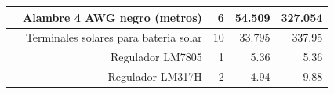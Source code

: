 \begin{landscape}
\begin{longtable}{|r|r|r|l|r|}
\hline
\cmidrule{Energético}    \rowcolor[rgb]{ .851,  .851,  .851}       & \multicolumn{1}{p{16.43em}|}{\cellcolor[rgb]{ 1,  1,  1}Alambre 4 AWG negro (metros)} & \cellcolor[rgb]{ 1,  1,  1}6 & \multicolumn{1}{r|}{\cellcolor[rgb]{ 1,  1,  1}54.509} & \cellcolor[rgb]{ 1,  1,  1}327.054 \\
\hline
\cmidrule{Energético}    \rowcolor[rgb]{ .851,  .851,  .851}       & \multicolumn{1}{p{16.43em}|}{\cellcolor[rgb]{ 1,  1,  1}Terminales solares para bateria solar} & \cellcolor[rgb]{ 1,  1,  1}10 & \multicolumn{1}{r|}{\cellcolor[rgb]{ 1,  1,  1}33.795} & \cellcolor[rgb]{ 1,  1,  1}337.95 \\
\hline
\cmidrule{Energético}    \rowcolor[rgb]{ .851,  .851,  .851}       & \multicolumn{1}{p{16.43em}|}{\cellcolor[rgb]{ 1,  1,  1}Regulador LM7805} & \cellcolor[rgb]{ 1,  1,  1}1 & \multicolumn{1}{r|}{\cellcolor[rgb]{ 1,  1,  1}5.36} & \cellcolor[rgb]{ 1,  1,  1}5.36 \\
\hline
\cmidrule{Energético}    \rowcolor[rgb]{ .851,  .851,  .851}       & \multicolumn{1}{p{16.43em}|}{\cellcolor[rgb]{ 1,  1,  1}Regulador LM317H} & \cellcolor[rgb]{ 1,  1,  1}2 & \multicolumn{1}{r|}{\cellcolor[rgb]{ 1,  1,  1}4.94} & \cellcolor[rgb]{ 1,  1,  1}9.88 \\
\hline


\end{longtable}
\end{landscape}
